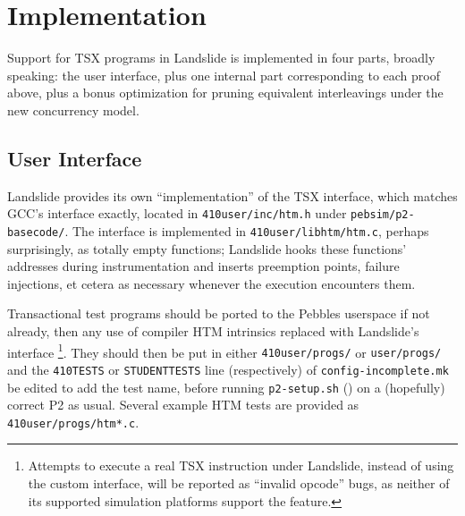 
\section{Implementation}

Support for TSX programs in Landslide is implemented in four parts, broadly speaking:
the user interface,
plus one internal part corresponding to each proof above,
plus a bonus optimization for pruning equivalent interleavings under the new concurrency model.

\subsection{User Interface}

Landslide provides its own ``implementation'' of the TSX interface,
which matches GCC's interface exactly,
located in {\tt 410user/inc/htm.h}
under {\tt pebsim/p2-basecode/}.
The interface is implemented in {\tt 410user/libhtm/htm.c},
perhaps surprisingly, as totally empty functions;
Landslide hooks these functions' addresses during instrumentation
and inserts preemption points, failure injections,
et cetera as necessary whenever the execution encounters them.

Transactional test programs should be ported to the Pebbles userspace if not already,
then any use of compiler HTM intrinsics replaced with Landslide's interface%
\footnote{Attempts to execute a real TSX instruction under Landslide, instead of using the custom interface,
will be reported as ``invalid opcode'' bugs,
as neither of its supported simulation platforms support the feature.
}.
They should then be put in either {\tt 410user/progs/} or {\tt user/progs/}
and the {\tt 410TESTS} or {\tt STUDENTTESTS} line (respectively) of {\tt config-incomplete.mk} be edited to add the test name,
before running {\tt p2-setup.sh} (\sect{\ref{sec:landslide-setup}})
on a (hopefully) correct P2 as usual.
Several example HTM tests are provided as {\tt 410user/progs/htm*.c}.

